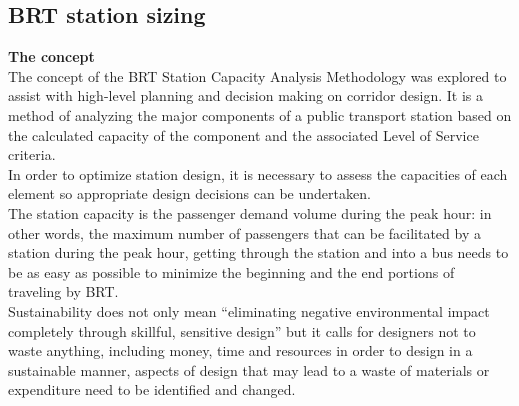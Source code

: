 \documentclass{article}
\begin{document}
\subsection{BRT station sizing}
\textbf{The concept}\\
The concept of the BRT Station Capacity Analysis Methodology was explored to assist with high-level planning and decision making on corridor design. It is a method of analyzing the major components of a public transport station based on the calculated capacity of the component and the associated Level of Service criteria.\\
In order to optimize station design, it is necessary to assess the capacities of each element so appropriate design decisions can be undertaken.\\
The station capacity is the passenger demand volume during the peak hour: in other words, the maximum number of passengers that can be facilitated by a station during the peak hour, getting through the station and into a bus needs to be as easy as possible to minimize the beginning and the end portions of traveling by BRT.\\
Sustainability does not only mean “eliminating negative environmental impact completely through skillful, sensitive design” but it calls for designers not to waste anything, including money, time and resources in order to design in a sustainable manner, aspects of design that may lead to a waste of materials or expenditure need to be identified and changed.\cite{BRTsizing}\\
\
\end{document}
